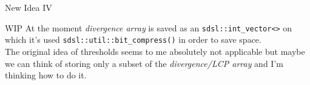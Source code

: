 \documentclass{beamer}
\begin{document}
\begin{frame}{New Idea IV}
  \begin{block}{WIP}
    At the moment \textit{divergence array} is saved as an
    \texttt{sdsl::int\_vector<>} on which it's used
    \texttt{sdsl::util::bit\_compress()} in order to save space.\\
    The original idea of thresholds seems to me absolutely not applicable but
    maybe we can think of storing only a subset of the \textit{divergence/LCP
      array} and I'm thinking how to do it.   
  \end{block}
\end{frame}
%   
%   
\end{document}
